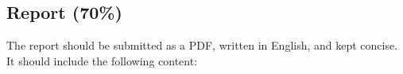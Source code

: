 \documentclass[11pt]{article}
\begin{document}

\subsection{Report (70\%)}

The report should be submitted as a PDF, written in English, and kept concise.
It should include the following content:
\end{document}
